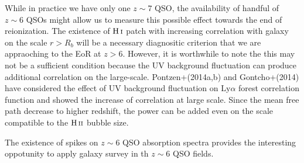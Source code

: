 \documentclass[useAMS,usenatbib,twocolumn]{mn2e}
\newcommand{\HI}{{\rm H\,{\scriptstyle I}}}
\newcommand{\HII}{{\rm H\,{\scriptstyle II}}}
\newcommand{\LyA}{\mbox{Ly}\alpha}
\begin{document}
While in practice we have only one $z\sim 7$ QSO, the availability of 
handful of $z\sim 6$ QSOs might allow us to measure this possible effect
towards the end of reionization. The existence of $\HI$ patch with increasing
correlation with galaxy on the scale $r>R_b$ will be a necessary diagnositic
criterion that we are appraoching to the EoR at $z>6$. However, it is worthwhile
to note the this may not be a sufficient condition because the UV background
fluctuation can produce additional correlation on the large-scale. 
Pontzen+(2014a,b) and Gontcho+(2014) have considered the effect of UV
background fluctuation on $\LyA$ forest correlation function and showed
the increase of correlation at large scale. Since the mean free path decrease
to higher redshift, the power can be added even on the scale compatible to
the $\HII$ bubble size. 

The existence of spikes on  $z\sim 6$ QSO absorption spectra provides the 
interesting oppotunity to apply galaxy survey in th $z\sim 6$ QSO fields.
\end{document}
